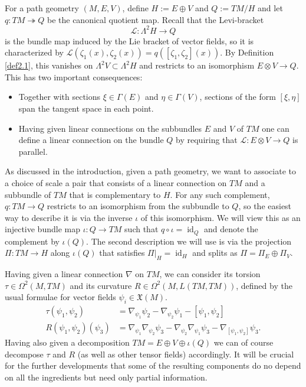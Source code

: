\documentclass[11pt]{amsart}
\newcommand{\id}{\operatorname{id}}
\numberwithin{proposition}{section}
\numberwithin{equation}{section}
\begin{document}
For a path geometry $(M,E,V)$, define $H:=E\oplus V$ and $Q:=TM/H$ and let  
$q:TM\twoheadrightarrow Q$ be the canonical quotient map. Recall that the Levi-bracket
\[\mathcal L:\Lambda^2 H\to Q\]
is the bundle map induced by the Lie bracket of vector fields, so it is characterized by $\mathcal L(\zeta_1(x),\zeta_2(x))=q([\zeta_1,\zeta_2](x))$. By Definition \ref{def2.1}, this vanishes on $\Lambda^2V\subset\Lambda^2H$ and restricts to an isomorphism $E\otimes V\to Q$. This has two important consequences: 
\begin{itemize}
    \item Together with sections $\xi\in\Gamma(E)$ and $\eta\in\Gamma(V)$, sections of the form $[\xi,\eta]$ span the tangent space in each point. 
    \item Having given linear connections on the subbundles $E$ and $V$ of $TM$ one can define a linear connection on the bundle $Q$ by requiring that $\mathcal L:E\otimes V\to Q$ is parallel.  
\end{itemize}

As discussed in the introduction, given a path geometry, we want to associate to a choice of scale a pair that consists of a linear connection on $TM$ and a subbundle of $TM$ that is complementary to $H$. For any such complement, $q:TM\to Q$ restricts to an isomorphism from the subbundle to $Q$, so the easiest way to describe it is via the inverse $\iota$ of this isomorphism. We will view this as an injective bundle map $\iota:Q\to TM$ such that $q\circ \iota=\id_Q$ and denote the complement by $\iota(Q)$. The second description we will use is via the projection $\Pi:TM\to H$ along $\iota(Q)$ that satisfies $\Pi|_H=\id_H$ and splits as $\Pi=\Pi_E\oplus\Pi_V$.      

Having given a linear connection $\nabla$ on $TM$, we can consider its torsion $\tau\in\Omega^2(M,TM)$ and its curvature $R\in \Omega^2(M,L(TM,TM))$, defined by the usual formulae for vector fields $\psi_i\in\mathfrak X(M)$. 
\begin{align*}\label{tors}
    \tau(\psi_1,\psi_2)&=\nabla_{\psi_1}\psi_2-\nabla_{\psi_2}\psi_1-[\psi_1,\psi_2]\\
    R(\psi_1,\psi_2)(\psi_3)&=\nabla_{\psi_1}\nabla_{\psi_2}\psi_3-\nabla_{\psi_2}\nabla_{\psi_1}\psi_3-\nabla_{[\psi_1,\psi_2]}\psi_3. 
\end{align*}
Having also given a decomposition $TM=E\oplus V\oplus\iota(Q)$ we can of course decompose $\tau$ and $R$ (as well as other tensor fields) accordingly. It will be crucial for the further developments that some of the resulting components do no depend on all the ingredients but need only partial information.
\end{document}
